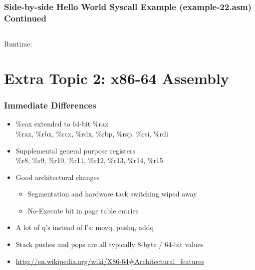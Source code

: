 \documentclass[11pt,xcolor=dvipsnames]{beamer}
\newcommand{\vs}{\vspace{0.5em}}
\newcommand{\mvs}{\vspace{-0.95em}}
\begin{document}
\begin{frame}[fragile,t]
\frametitle{Side-by-side Hello World Syscall Example (example-22.asm) Continued}
\mvs
\begin{columns}[T]
\end{columns}
\vs
{\footnotesize Runtime:}
\end{frame}

\section{Extra Topic 2: x86-64 Assembly}

\begin{frame}[fragile,t]
\frametitle{Immediate Differences}
\begin{itemize}
  \item {\ttfamily \%eax} extended to 64-bit {\ttfamily \%rax} \\
  {\ttfamily \%rax, \%rbx, \%rcx, \%rdx, \%rbp, \%rsp, \%rsi, \%rdi}
  \item Supplemental general purpose registers \\
  {\ttfamily \%r8, \%r9, \%r10, \%r11, \%r12, \%r13, \%r14, \%r15}
  \vs \vs
  \item Good architectural changes
  \begin{itemize}
    \item Segmentation and hardware task switching wiped away
    \item No-Execute bit in page table entries
  \end{itemize}
  \vs
  \item A lot of q's instead of l's: {\ttfamily movq, pushq, addq}
  \item Stack pushes and pops are all typically 8-byte / 64-bit values
  \item {\small \url{http://en.wikipedia.org/wiki/X86-64#Architectural\_features}}
\end{itemize}
\end{frame}
\end{document}
